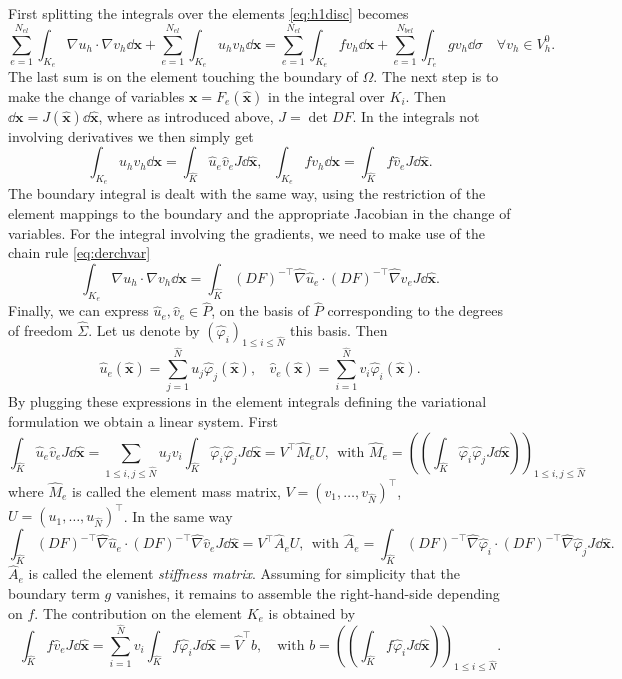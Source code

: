 First splitting the integrals over the elements \eqref{eq:h1disc} becomes
$$\sum_{e=1}^{N_{el}}\int_{K_e} \nabla u_h\cdot\nabla v_h\dd \mathbf{x} +\sum_{e=1}^{N_{el}}\int_{K_e} u_hv_h\dd \mathbf{x} =\sum_{e=1}^{N_{el}}\int_{K_e} fv_h\dd \mathbf{x}
+\sum_{e=1}^{N_{bel}}\int_{\Gamma_e} gv_h \dd \sigma \quad\forall v_h\in V^0_h.
$$
The last sum is on the element touching the boundary of $\Omega$. The next step is to make the change of variables $ \mathbf{x}= F_e( \hat{\mathbf{x}})$
 in the integral over $K_i$. Then $ \dd \mathbf{x}= J(\hat{ \mathbf{x}}) \dd\hat{\mathbf{x}}$, where as introduced above, $J=\det DF$. In the integrals not involving derivatives we then simply get
 $$ \int_{K_e} u_hv_h\dd \mathbf{x} = \int_{\hat{K}} \hat{u}_e \hat{v}_e J \dd \hat{\mathbf{x}}, ~~~
 \int_{K_e} fv_h\dd \mathbf{x} = \int_{\hat{K}} f\hat{v}_e J\dd \hat{\mathbf{x}}.$$
 The boundary integral is dealt with the same way, using the restriction of the element mappings to the boundary and the appropriate Jacobian in the change of variables. For the integral involving the gradients, we need to make use of the chain rule \eqref{eq:derchvar}
$$\int_{K_e} \nabla u_h\cdot\nabla v_h\dd \mathbf{x} = \int_{\hat{K}} (DF)^{-\top}\hat{\nabla} \hat{u}_e\cdot (DF)^{-\top} \hat{\nabla} \hat{v}_e J\dd \hat{\mathbf{x} }.
$$ 
Finally, we can express $ \hat{u}_e,  \hat{v}_e \in \hat{P}$, on the basis of $\hat{P}$ corresponding to the degrees of freedom $\hat{\Sigma}$. Let us denote by $ (\hat{\varphi}_i)_{1\leq i \leq \hat{N}}$ this basis. Then
$$  \hat{u}_e ( \hat{\mathbf{x}})= \sum_{j=1}^{\hat{N}} u_j \hat{\varphi}_j( \hat{\mathbf{x}}), ~~~~ \hat{v}_e( \hat{\mathbf{x}}) = \sum_{i=1}^{\hat{N}} v_i \hat{\varphi}_i( \hat{\mathbf{x}}).$$
By plugging these expressions in the element integrals defining the variational formulation we obtain a linear system. First
$$\int_{\hat{K}} \hat{u}_e \hat{v}_e J \dd \hat{\mathbf{x}} = 
\sum_{1\leq i,j \leq \hat{N}} u_j v_i \int_{\hat{K}} \hat{\varphi}_i \hat{\varphi}_j J \dd \hat{\mathbf{x}} = V^\top \hat{M}_e U, ~~
\mbox{with } \hat{M}_e=(( \int_{\hat{K}} \hat{\varphi}_i \hat{\varphi}_j J \dd \hat{\mathbf{x}}))_{1\leq i,j \leq \hat{N}} $$
where $\hat{M}_e$ is called the element mass matrix, $V=(v_1, \dots, v_{\hat{N}})^\top$,  $U=(u_1, \dots, u_{\hat{N}})^\top$.
In the same way
$$\int_{\hat{K}} (DF)^{-\top}\hat{\nabla} \hat{u}_e\cdot (DF)^{-\top} \hat{\nabla} \hat{v}_e J\dd \hat{\mathbf{x} }
=V^\top \hat{A}_e U, ~~\mbox{with } \hat{A}_e= \int_{\hat{K}} (DF)^{-\top}\hat{\nabla} \hat{\varphi}_i\cdot (DF)^{-\top} \hat{\nabla} \hat{\varphi}_j J\dd \hat{\mathbf{x} }.$$
$\hat{A}_e$ is called the element \emph{stiffness matrix}.
Assuming for simplicity that the boundary term $g$ vanishes, it remains to assemble the right-hand-side depending on $f$. The contribution on the element $K_e$ is obtained by
$$\int_{\hat{K}} f\hat{v}_e J\dd \hat{\mathbf{x}} = \sum_{i=1}^{\hat{N}} v_i \int_{\hat{K}} f\hat{\varphi}_i J\dd \hat{\mathbf{x}} = \hat{V}^\top b, ~~~ \mbox{ with } b= (( \int_{\hat{K}} f\hat{\varphi}_i J\dd \hat{\mathbf{x}}))_{1 \leq i \leq \hat{N}}.$$

